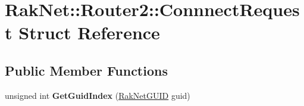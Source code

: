 \hypertarget{struct_rak_net_1_1_router2_1_1_connnect_request}{\section{Rak\-Net\-:\-:Router2\-:\-:Connnect\-Request Struct Reference}
\label{struct_rak_net_1_1_router2_1_1_connnect_request}
}
\subsection*{Public Member Functions}
\begin{DoxyCompactItemize}
\item 
\hypertarget{struct_rak_net_1_1_router2_1_1_connnect_request_a8bc92735b4a27e4df9c3ca94b3dba3d7}{unsigned int {\bfseries Get\-Guid\-Index} (\hyperlink{struct_rak_net_1_1_rak_net_g_u_i_d}{Rak\-Net\-G\-U\-I\-D} guid)}\label{struct_rak_net_1_1_router2_1_1_connnect_request_a8bc92735b4a27e4df9c3ca94b3dba3d7}

\end{DoxyCompactItemize}
